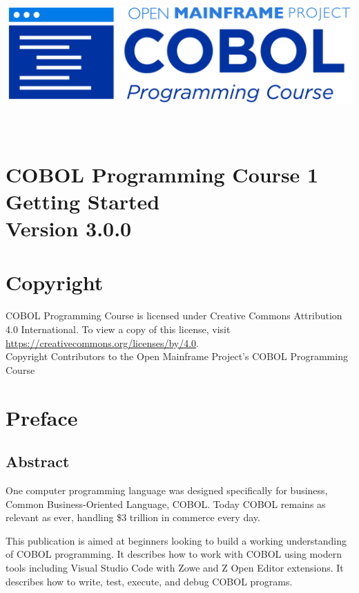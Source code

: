 \begin{center}
  \vspace*{25pt}
\includegraphics{Images/COBOL-Programming-Course.png}
\hypertarget{cobol-programming-course-1}{%
\section*{
  \\[35pt]
  \Huge COBOL Programming Course 1 \\[10pt]
  \Huge Getting Started \\[15pt]
  \Large Version 3.0.0}\label{cobol-programming-course-1}}
\end{center}

\pagebreak
\hypertarget{copyright}{%
\section*{Copyright}{
  \normalsize COBOL Programming Course is licensed under Creative Commons 
  Attribution 4.0 International. To view a copy of this license, visit 
  \href{https://creativecommons.org/licenses/by/4.0}{https://creativecommons.org/licenses/by/4.0}. \\[10pt]
  Copyright Contributors to the Open Mainframe Project's COBOL Programming Course}\label{copyright}}
\pagebreak

\hypertarget{preface}{%
\section*{Preface}\label{preface}}

\hypertarget{abstract}{%
\subsection*{Abstract}\label{abstract}}

One computer programming language was designed specifically for
business, Common Business-Oriented Language, COBOL. Today COBOL remains
as relevant as ever, handling \$3 trillion in commerce every day.

This publication is aimed at beginners looking to build a working
understanding of COBOL programming. It describes how to work with COBOL
using modern tools including Visual Studio Code with Zowe and Z Open
Editor extensions. It describes how to write, test, execute, and debug
COBOL programs.

